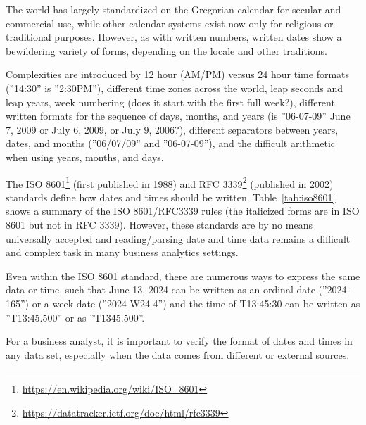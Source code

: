 The world has largely standardized on the Gregorian calendar for secular and commercial use, while other calendar systems exist now only for religious or traditional purposes. However, as with written numbers, written dates show a bewildering variety of forms, depending on the locale and other traditions.

Complexities are introduced by 12 hour (AM/PM) versus 24 hour time formats (''14:30'' is ''2:30PM''), different time zones across the world, leap seconds and leap years, week numbering (does it start with the first full week?), different written formats for the sequence of days, months, and years (is ''06-07-09'' June 7, 2009 or July 6, 2009, or July 9, 2006?), different separators between years, dates, and months (''06/07/09'' and ''06-07-09''), and the difficult arithmetic when using years, months, and days. 

The ISO 8601\footnote{\url{https://en.wikipedia.org/wiki/ISO_8601}} (first published in 1988) and RFC 3339\footnote{\url{https://datatracker.ietf.org/doc/html/rfc3339}} (published in 2002) standards define how dates and times should be written. Table~\ref{tab:iso8601} shows a summary of the ISO 8601/RFC3339 rules (the italicized forms are in ISO 8601 but not in RFC 3339). However, these standards are by no means universally accepted and reading/parsing date and time data remains a difficult and complex task in many business analytics settings. 

Even within the ISO 8601 standard, there are numerous ways to express the same data or time, such that June 13, 2024 can be written as an ordinal date (''2024-165'') or a week date (''2024-W24-4'') and the time of T13:45:30 can be written as ''T13:45.500'' or as ''T1345.500''. 

\begin{tcolorbox}[colback=alert]
For a business analyst, it is important to verify the format of dates and times in any data set, especially when the data comes from different or external sources.
\end{tcolorbox}

